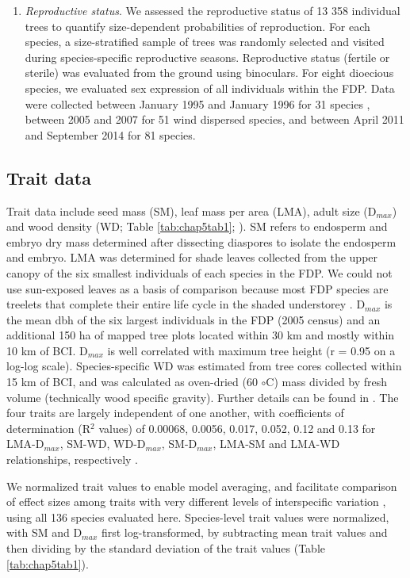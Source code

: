 \documentclass[b5paper,justified]{tufte-book} %
\begin{document}
\begin{fullwidth}
\begin{enumerate}
\item \textit{Reproductive status}. We assessed the reproductive status of 13 358 individual trees to quantify size-dependent probabilities of reproduction. For each species, a size-stratified sample of trees was randomly selected and visited during species-specific reproductive seasons. Reproductive status (fertile or sterile) was evaluated from the ground using binoculars. For eight dioecious species, we evaluated sex expression of all individuals within the FDP. Data were collected between January 1995 and January 1996 for 31 species \citep{Wright2005}, between
2005 and 2007 for 51 wind dispersed species, and between April 2011 and September 2014 for 81 species.
\end{enumerate}

\subsection{Trait data}
Trait data include seed mass (SM), leaf mass per area (LMA), adult size (D$_{max}$) and wood density (WD; Table \ref{tab:chap5tab1}; \citealt{Wright2010}). SM refers to endosperm and embryo dry mass determined after dissecting diaspores to isolate the endosperm and embryo. LMA was determined for shade leaves collected from the upper
canopy of the six smallest individuals of each species in the FDP. We could not use sun-exposed leaves as a basis of comparison because most FDP species are treelets that complete their entire life cycle in the shaded understorey \citep{King2005a}. D$_{max}$ is the mean dbh of the six largest individuals in the FDP (2005 census) and an additional 150 ha of mapped tree plots located within 30 km and mostly within 10 km of BCI. D$_{max}$ is well correlated with maximum tree height (r = 0.95 on a log-log scale). Species-specific WD was estimated from tree cores collected within 15 km of BCI, and was calculated as oven-dried (60 $\circ$C) mass divided by fresh volume (technically wood specific gravity). Further details can be found in \citet{Wright2010}. The four traits are largely independent of one another, with coefficients of determination (R$^2$ values) of 0.00068, 0.0056, 0.017, 0.052, 0.12 and 0.13 for LMA-D$_{max}$, SM-WD, WD-D$_{max}$, SM-D$_{max}$, LMA-SM and LMA-WD relationships, respectively \citep{Wright2010}.

We normalized trait values to enable model averaging, and facilitate comparison of effect sizes among traits with very different levels of interspecific variation \citep{Grueber2011}, using all 136 species evaluated here. Species-level trait values were normalized, with SM and D$_{max}$ first log-transformed, by subtracting mean trait values and then dividing by the standard deviation of the trait values (Table \ref{tab:chap5tab1}).


\end{fullwidth}
\end{document}
